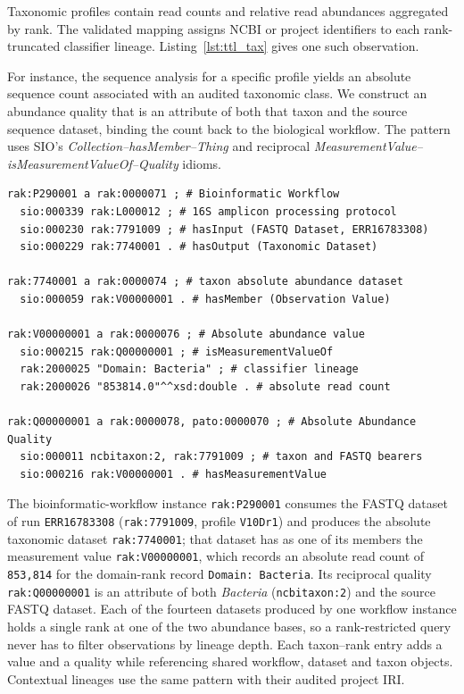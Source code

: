 Taxonomic profiles contain read counts and relative read abundances
aggregated by rank. The validated mapping assigns NCBI or project
identifiers to each rank-truncated classifier lineage.
Listing~\ref{lst:ttl_tax} gives one such observation.

For instance, the sequence analysis for a specific profile yields an
absolute sequence count associated with an audited taxonomic class. We
construct an abundance quality that is an attribute of both that taxon
and the source sequence dataset, binding the count back to the
biological workflow. The pattern uses SIO's
\emph{Collection--hasMember--Thing} and reciprocal
\emph{MeasurementValue--isMeasurementValueOf--Quality} idioms.



\begin{lstlisting}[caption={Turtle representation of taxonomic abundance formalized from a feature table.}, label={lst:ttl_tax}, basicstyle=\ttfamily\scriptsize, frame=single]
rak:P290001 a rak:0000071 ; # Bioinformatic Workflow
  sio:000339 rak:L000012 ; # 16S amplicon processing protocol
  sio:000230 rak:7791009 ; # hasInput (FASTQ Dataset, ERR16783308)
  sio:000229 rak:7740001 . # hasOutput (Taxonomic Dataset)

rak:7740001 a rak:0000074 ; # taxon absolute abundance dataset
  sio:000059 rak:V00000001 . # hasMember (Observation Value)

rak:V00000001 a rak:0000076 ; # Absolute abundance value
  sio:000215 rak:Q00000001 ; # isMeasurementValueOf
  rak:2000025 "Domain: Bacteria" ; # classifier lineage
  rak:2000026 "853814.0"^^xsd:double . # absolute read count

rak:Q00000001 a rak:0000078, pato:0000070 ; # Absolute Abundance Quality
  sio:000011 ncbitaxon:2, rak:7791009 ; # taxon and FASTQ bearers
  sio:000216 rak:V00000001 . # hasMeasurementValue
\end{lstlisting}

The bioinformatic-workflow instance
\texttt{rak:P290001} consumes the FASTQ dataset of run
\texttt{ERR16783308} (\texttt{rak:7791009}, profile \texttt{V10Dr1})
and produces the absolute taxonomic dataset
\texttt{rak:7740001}; that dataset has as one of its members the
measurement value \texttt{rak:V00000001}, which records an absolute
read count of \texttt{853{,}814} for the domain-rank record
\texttt{Domain: Bacteria}. Its reciprocal quality
\texttt{rak:Q00000001} is an attribute of both \emph{Bacteria}
(\texttt{ncbitaxon:2}) and the source FASTQ dataset. Each of the
fourteen datasets produced by one workflow instance holds a single
rank at one of the two abundance bases, so a rank-restricted query
never has to filter observations by lineage depth. Each taxon--rank entry adds a value and a quality while referencing
shared workflow, dataset and taxon objects. Contextual
lineages use the same pattern with their audited project IRI.

